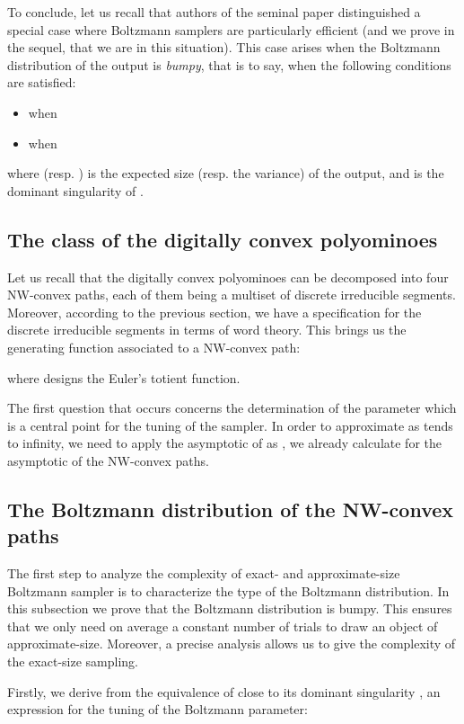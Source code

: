 \documentclass{article}
\begin{document}
To conclude, let us recall that authors of the seminal paper \cite{DuFlLoSc04}
distinguished a special case where Boltzmann samplers are particularly
efficient (and we prove in the sequel, that we are in this
situation). This case arises when the Boltzmann distribution of the
output is \emph{bumpy}, that is to say, when the following conditions
are satisfied:
\vspace{-0.3cm}
\begin{itemize}
\item  when 
\item  when 
\end{itemize}
where  (resp.  ) is the expected size (resp. the variance) of the output, and  is the dominant singularity of .
\subsection{The class of the digitally convex polyominoes}
Let us recall that the digitally convex polyominoes can be
decomposed into four NW-convex paths, each of them being a multiset of
discrete irreducible segments. Moreover, according to the previous
section, we have a specification for the discrete irreducible
segments in terms of word theory. This brings us the generating
function associated to a NW-convex path:

where  designs the Euler's totient function.

The first question that occurs concerns the determination of the
parameter  which is a central point for the tuning of the
sampler. In order to approximate  as  tends to infinity,
we need to apply the asymptotic of  as , we already calculate for the asymptotic of the NW-convex paths.


\subsection{The Boltzmann distribution of the NW-convex paths}
The first step to analyze the complexity of exact- and
approximate-size Boltzmann sampler is to characterize the type of
the Boltzmann distribution. In this subsection we prove that the Boltzmann distribution
is bumpy. This ensures that we only need on average a constant
number of trials to draw an object of approximate-size. Moreover,
a precise analysis allows us to give the complexity of the
exact-size sampling.

Firstly, we derive from the equivalence of  close to its dominant singularity , an expression for the tuning of the Boltzmann
parameter:
\end{document}
